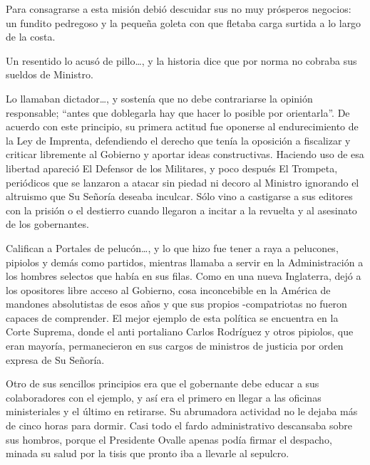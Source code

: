\documentclass[10pt,twoside,openright]{memoir}
\begin{document}
Para consagrarse a esta misión debió descuidar sus no muy prósperos
negocios: un fundito pedregoso y la pequeña goleta con que fletaba carga
surtida a lo largo de la costa.

Un resentido lo acusó de pillo\ldots, y la historia dice que por norma no
cobraba sus sueldos de Ministro.

Lo llamaban dictador\ldots, y sostenía que no debe contrariarse la opinión
responsable; ``antes que doblegarla hay que hacer lo posible por
orientarla''. De acuerdo con este principio, su primera actitud fue
oponerse al endurecimiento de la Ley de Imprenta, defendiendo el derecho
que tenía la oposición a fiscalizar y criticar libremente al Gobierno y
aportar ideas constructivas. Haciendo uso de esa libertad apareció El
Defensor de los Militares, y poco después
El Trompeta, periódicos que se
lanzaron a atacar sin piedad ni decoro al Ministro ignorando el
altruismo que Su Señoría deseaba inculcar. Sólo vino a castigarse a sus
editores con la prisión o el destierro cuando llegaron a incitar a la
revuelta y al asesinato de los
gobernantes.

Califican a Portales de pelucón\ldots, y lo que hizo fue tener a raya a
pelucones, pipiolos y demás como partidos, mientras llamaba a servir en
la Administración a los hombres selectos que había en sus filas. Como en
una nueva Inglaterra, dejó a los opositores libre acceso al Gobierno,
cosa inconcebible en la América de
mandones absolutistas de esos años y que sus propios -compatriotas no
fueron capaces de comprender. El mejor ejemplo de esta política se
encuentra en la Corte Suprema, donde el anti portaliano Carlos Rodríguez
y otros pipiolos, que eran mayoría, permanecieron en sus cargos de
ministros de justicia por orden expresa de Su Señoría.

Otro de sus sencillos principios era que el gobernante debe educar a sus
colaboradores con el ejemplo, y así era el primero en llegar a las
oficinas ministeriales y el último en retirarse. Su abrumadora actividad
no le dejaba más de cinco horas para dormir. Casi todo el fardo
administrativo descansaba sobre sus hombros, porque el Presidente Ovalle
apenas podía firmar el despacho, minada su salud por la tisis que pronto
iba a llevarle al sepulcro.
\end{document}
